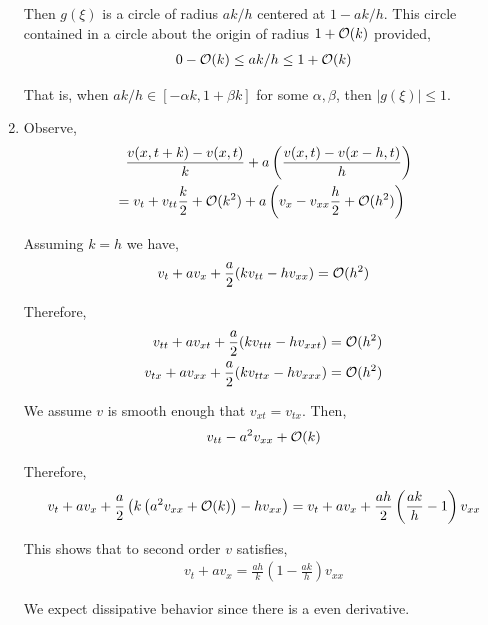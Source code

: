 \documentclass[10pt]{article}
\begin{document}
\begin{solution}[Solution]
\begin{enumerate}[label=(\alph*)]
        Then \( g(\xi) \) is a circle of radius \( ak/h \) centered at \( 1-ak/h \). This circle contained in a circle about the origin of radius \( 1+\mathcal{O}(k) \) provided,
        \begin{align*}
            0-\mathcal{O}(k) \leq ak/h \leq 1 + \mathcal{O}(k)
        \end{align*}

        That is, when \( ak/h \in [-\alpha k,  1 + \beta k] \) for some \( \alpha, \beta \), then \( |g(\xi)| \leq 1 \).


    \item
        Observe,
        \begin{align*}
            &\phantom{=}\frac{v(x,t+k)-v(x,t)}{k} + a \left( \frac{v(x,t) - v(x-h,t)}{h} \right)
            \\&= v_t + v_{tt}\frac{k}{2} + \mathcal{O}(k^2) + a \left( v_x - v_{xx} \frac{h}{2} + \mathcal{O}(h^2)\right)
        \end{align*}
        
        Assuming \( k=h \) we have,
        \begin{align*}
            v_t + a v_x + \frac{a}{2} (k v_{tt} - hv_{xx}) = \mathcal{O}(h^2)
        \end{align*}

        Therefore,
        \begin{align*}
            v_{tt} + av_{xt} + \frac{a}{2} (k v_{ttt} - hv_{xxt} ) &= \mathcal{O}(h^2)
            \\ v_{tx} + a v_{xx} + \frac{a}{2} (kv_{ttx} - h v_{xxx}) &= \mathcal{O}(h^2)
        \end{align*}

        We assume \( v \) is smooth enough that \( v_{xt} = v_{tx} \). Then,
        \begin{align*}
            v_{tt} - a^2 v_{xx} + \mathcal{O}(k)
        \end{align*}
        
        Therefore,
        \begin{align*}
            v_t + av_x + \frac{a}{2} \left( k \left( a^2v_{xx} + \mathcal{O}(k) \right) - h v_{xx} \right)
            = v_t + av_x + \frac{ah}{2} \left( \frac{ak}{h}-1 \right)v_{xx}
        \end{align*}
        
        This shows that to second order \( v \) satisfies,
        \begin{align*}
            v_t + av_x = \frac{ah}{k} \left( 1-\frac{ak}{h} \right)v_{xx}
        \end{align*}
               

        We expect dissipative behavior since there is a even derivative.

\end{enumerate}

\end{solution}
\end{document}
